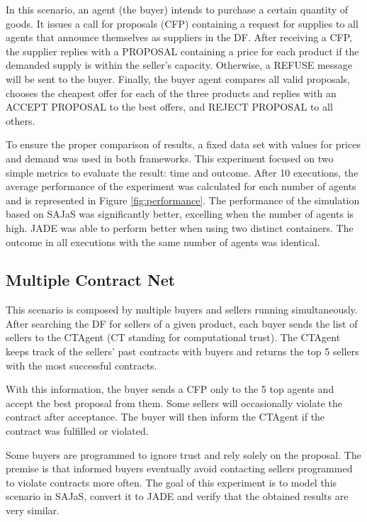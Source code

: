 \documentclass[a4paper,twoside]{article}
\begin{document}
In this scenario, an agent (the buyer) intends to purchase a certain quantity of goods. It issues a call for proposals (CFP) containing a request for supplies to all agents that announce themselves as suppliers in the DF. After receiving a CFP, the supplier replies with a PROPOSAL containing a price for each product if the demanded supply is within the seller's capacity. Otherwise, a REFUSE message will be sent to the buyer. Finally, the buyer agent compares all valid proposals, chooses the cheapest offer for each of the three products and replies with an ACCEPT PROPOSAL to the best offers, and REJECT PROPOSAL to all others.

To ensure the proper comparison of results, a fixed data set with values for prices and demand was used in both frameworks. This experiment focused on two simple metrics to evaluate the result: time and outcome. After 10 executions, the average performance of the experiment was calculated for each number of agents and is represented in Figure \ref{fig:performance}. The performance of the simulation based on SAJaS was significantly better, excelling when the number of agents is high. JADE was able to perform better when using two distinct containers. The outcome in all executions with the same number of agents was identical.



\subsection{Multiple Contract Net}

This scenario is composed by multiple buyers and sellers running simultaneously. After searching the DF for sellers of a given product, each buyer sends the list of sellers to the CTAgent (CT standing for computational trust). The CTAgent keeps track of the sellers' past contracts with buyers and returns the top 5 sellers with the most successful contracts.

With this information, the buyer sends a CFP only to the 5 top agents and accept the best proposal from them. Some sellers will occasionally violate the contract after acceptance. The buyer will then inform the CTAgent if the contract was fulfilled or violated.

Some buyers are programmed to ignore trust and rely solely on the proposal. The premise is that informed buyers eventually avoid contacting sellers programmed to violate contracts more often. The goal of this experiment is to model this scenario in SAJaS, convert it to JADE and verify that the obtained results are very similar.
\end{document}
